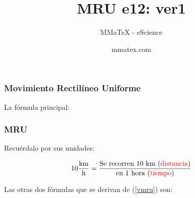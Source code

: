 \documentclass{beamer}
\title{MRU e12: ver1}
\subtitle{MMaTeX - eScience}
\author{mmatex.com}
\newcommand{\red}[1]{\textcolor{red}{#1}}
\begin{document}
\maketitle







\begin{frame}
\frametitle{Movimiento Rectil\'ineo Uniforme}

% 


La f\'ormula principal:

{\huge \vmru}

\vNUa
\end{frame}

\begin{frame}
\frametitle{MRU}
Recu\'erdalo por sus unidades:

\begin{equation*}
10\frac{\text{km}}{\text{h}} =
\frac{\text{Se recorren 10 km (\red{distancia})}}
{\text{en 1 hora (\red{tiempo})}}
\end{equation*}

Las otras dos f\'ormulas que se derivan de (\ref{vmru}) son:

{\large \xmru \\ \tmru}
\end{frame}
\end{document}

